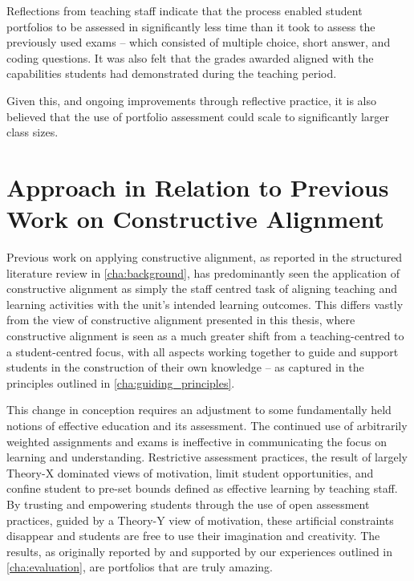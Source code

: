 Reflections from teaching staff indicate that the process enabled student portfolios to be assessed in significantly less time than it took to assess the previously used exams -- which consisted of multiple choice, short answer, and coding questions. It was also felt that the grades awarded aligned with the capabilities students had demonstrated during the teaching period.

Given this, and ongoing improvements through reflective practice, it is also believed that the use of portfolio assessment could scale to significantly larger class sizes.



\clearpage
\section{Approach in Relation to Previous Work on Constructive Alignment} %
\label{sec:approach_in_relation_to_previous_work}

Previous work on applying constructive alignment, as reported in the structured literature review in \cref{cha:background}, has predominantly seen the application of constructive alignment as simply the staff centred task of aligning teaching and learning activities with the unit's intended learning outcomes. This differs vastly from the view of constructive alignment presented in this thesis, where constructive alignment is seen as a much greater shift from a teaching-centred to a student-centred focus, with all aspects working together to guide and support students in the construction of their own knowledge -- as captured in the principles outlined in \cref{cha:guiding_principles}.

This change in conception requires an adjustment to some fundamentally held notions of effective education and its assessment. The continued use of arbitrarily weighted assignments and exams is ineffective in communicating the focus on learning and understanding. Restrictive assessment practices, the result of largely Theory-X dominated views of motivation, limit student opportunities, and confine student to pre-set bounds defined as effective learning by teaching staff. By trusting and empowering students through the use of open assessment practices, guided by a Theory-Y view of motivation, these artificial constraints disappear and students are free to use their imagination and creativity. The results, as originally reported by \citet{Biggs:2007} and supported by our experiences outlined in \cref{cha:evaluation}, are portfolios that are truly amazing. 

